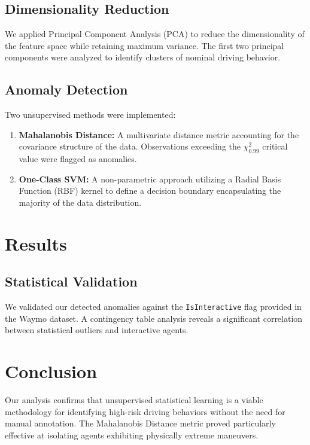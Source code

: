 \documentclass[conference]{IEEEtran}
\begin{document}
\subsection{Dimensionality Reduction}
We applied Principal Component Analysis (PCA) to reduce the dimensionality of the feature space while retaining maximum variance. The first two principal components were analyzed to identify clusters of nominal driving behavior.

\subsection{Anomaly Detection}
Two unsupervised methods were implemented:
\begin{enumerate}
    \item \textbf{Mahalanobis Distance:} A multivariate distance metric accounting for the covariance structure of the data. Observations exceeding the $\chi^2_{0.99}$ critical value were flagged as anomalies.
    \item \textbf{One-Class SVM:} A non-parametric approach utilizing a Radial Basis Function (RBF) kernel to define a decision boundary encapsulating the majority of the data distribution.
\end{enumerate}

\section{Results}
\subsection{Statistical Validation}
We validated our detected anomalies against the \texttt{IsInteractive} flag provided in the Waymo dataset. A contingency table analysis reveals a significant correlation between statistical outliers and interactive agents.


\section{Conclusion}
Our analysis confirms that unsupervised statistical learning is a viable methodology for identifying high-risk driving behaviors without the need for manual annotation. The Mahalanobis Distance metric proved particularly effective at isolating agents exhibiting physically extreme maneuvers.


% 
\end{document}
